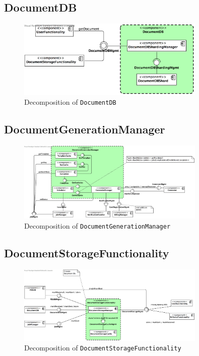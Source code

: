 \documentclass[a4paper,10pt]{article}
\begin{document}
\subsection{DocumentDB}
\begin{figure}[!htp]
	\centering
	\includegraphics[width=0.8\textwidth]{DocumentDB.png}
	\caption{Decomposition of \texttt{DocumentDB}}
	\label{fig:decomp-DocumentDB}
\end{figure}

\subsection{DocumentGenerationManager}
\begin{figure}[!htp]
	\centering
	\includegraphics[width=0.8\textwidth]{DocumentGenerationManager.png}
	\caption{Decomposition of \texttt{DocumentGenerationManager}}
	\label{fig:decomp-DocumentGenerationManager}
\end{figure}

\subsection{DocumentStorageFunctionality}
\begin{figure}[!htp]
	\centering
	\includegraphics[width=0.8\textwidth]{DocumentStorageFunctionality.png}
	\caption{Decomposition of \texttt{DocumentStorageFunctionality}}
	\label{fig:decomp-DocumentStorageFunctionality}
\end{figure}
\end{document}

